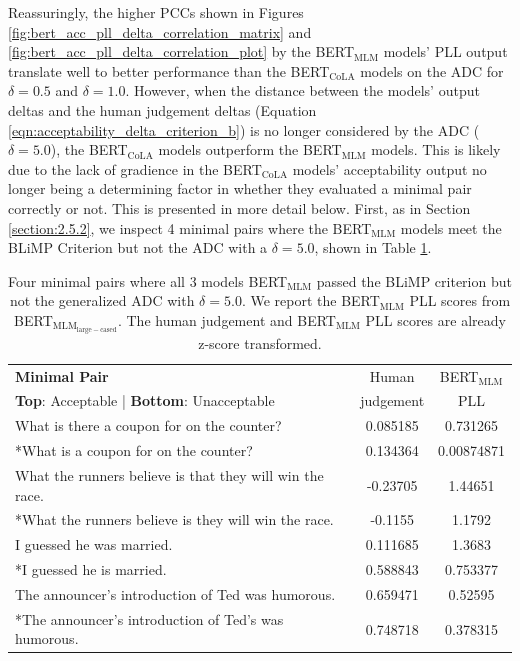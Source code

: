 Reassuringly, the higher PCCs shown in Figures \ref{fig:bert_acc_pll_delta_correlation_matrix} and \ref{fig:bert_acc_pll_delta_correlation_plot} by the BERT$_{\mathrm{MLM}}$ models' PLL output translate well to better performance than the BERT$_{\mathrm{CoLA}}$ models on the ADC for $\delta=0.5$ and $\delta=1.0$.  However, when the distance between the models' output deltas and the human judgement deltas (Equation \ref{eqn:acceptability_delta_criterion_b}) is no longer considered by the ADC ($\delta=5.0$), the BERT$_{\mathrm{CoLA}}$ models outperform the BERT$_{\mathrm{MLM}}$ models.  This is likely due to the lack of gradience in the BERT$_{\mathrm{CoLA}}$ models' acceptability output no longer being a determining factor in whether they evaluated a minimal pair correctly or not. This is presented in more detail below. First, as in Section \ref{section:2.5.2}, we inspect 4 minimal pairs where the BERT$_{\mathrm{MLM}}$ models meet the BLiMP Criterion but not the ADC with a $\delta=5.0$, shown in Table \ref{tab:table_16}.  

\begin{table}[h]
    \centering
    \begin{tabular}{@{}lcc@{}}
    \toprule
    \textbf{Minimal Pair} & Human & BERT$_{\mathrm{MLM}}$\\
    \textbf{Top}: Acceptable | \textbf{Bottom}: Unacceptable & judgement & PLL\\
    \toprule
    What is there a coupon for on the counter?  & 0.085185 & 0.731265 \\
    *What is a coupon for on the counter? & 0.134364 & 0.00874871 \\
    \midrule
   What the runners believe is that they will win the race. & -0.23705 &  1.44651 \\
    *What the runners believe is they will win the race. &  -0.1155 & 1.1792 \\
    \midrule
    I guessed he was married. & 0.111685 & 1.3683 \\
    *I guessed he is married.  &  0.588843	 & 0.753377 \\
    \midrule
    The announcer's introduction of Ted was humorous.  & 0.659471 & 0.52595 \\
    *The announcer's introduction of Ted's was humorous. & 0.748718 & 0.378315 \\
    \bottomrule
    \end{tabular}
    \caption[Four minimal pairs where BERT$_{\mathrm{MLM}}$ meets the BLiMP\newline Criterion but not the ADC with $\delta=5.0$]{Four minimal pairs where all 3 models BERT$_{\mathrm{MLM}}$ passed the BLiMP criterion but not the generalized ADC with $\delta=5.0$. We report the BERT$_{\mathrm{MLM}}$ PLL scores from BERT$_{\mathrm{MLM}_{\mathrm{large-cased}}}$. The human judgement and BERT$_{\mathrm{MLM}}$ PLL scores are already z-score transformed.}
    \label{tab:table_16}
\end{table}

